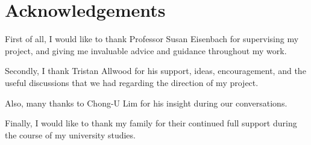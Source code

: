 \chapter*{Acknowledgements}

First of all, I would like to thank Professor Susan Eisenbach for supervising my project, and giving me invaluable advice and guidance throughout my work.

Secondly, I thank Tristan Allwood for his support, ideas, encouragement, and the useful discussions that we had regarding the direction of my project.

Also, many thanks to Chong-U Lim for his insight during our conversations.

Finally, I would like to thank my family for their continued full support during the course of my university studies.
